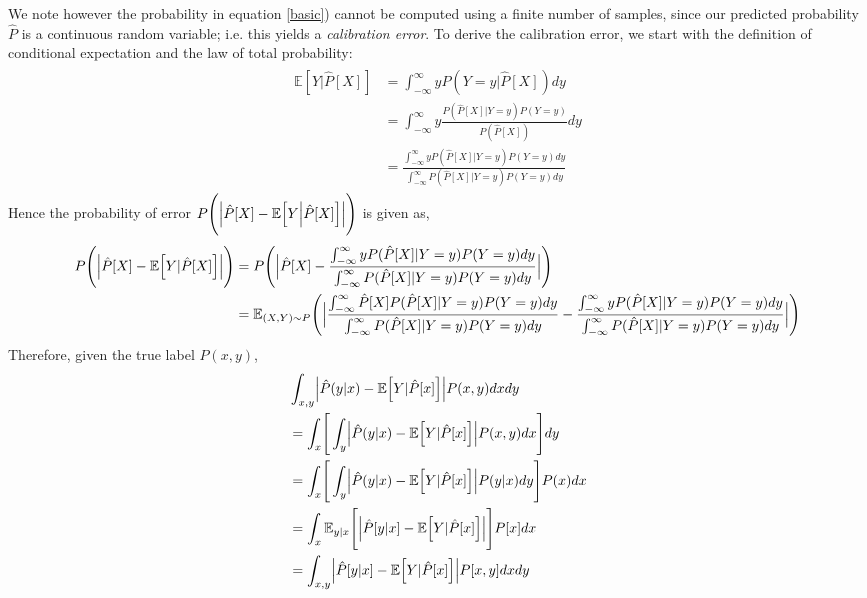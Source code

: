 \documentclass[10pt]{article}[draft]
\begin{document}
We note however the probability in equation \ref{basic}) cannot be computed using a finite number of samples, since our predicted probability $\hat{P}$ is a continuous random variable; i.e. this  yields a \emph{calibration error}.  To derive the calibration error, we start with the definition of conditional expectation and the  law of total probability:
\begin{align*}
	\begin{split}
	\mathbb{E}[Y|\hat{P}[X]] &= \int_{-\infty}^{\infty} y P(Y=y|\hat{P}[X])dy \\
	&= \int_{-\infty}^{\infty}  y \frac{P(\hat{P}[X]|Y=y)P(Y=y)}{P(\hat{P}[X])}dy \\
	&= \frac{\int_{-\infty}^{\infty}  y P(\hat{P}[X]|Y=y)P(Y=y)dy}{\int_{-\infty}^{\infty}  P(\hat{P}[X]|Y=y)P(Y=y)dy}
	\end{split}
\end{align*}
Hence the probability of error $P  \Biggl( \Bigl| \hat{P}[X] - \mathbb{E}\Bigr[ Y \Bigr| \hat{P}[X]\Bigl] \Bigr| \Biggr)$ is given as,
\begin{align*}
	\begin{split}
P  \Biggl( \Bigl| \hat{P}[X] - \mathbb{E}\Bigr[ Y | \hat{P}[X]\Bigl] \Bigr| \Biggr) &=  P  \Biggl( \Bigl| \hat{P}[X] - \frac{\int_{-\infty}^{\infty}  y P(\hat{P}[X]|Y=y)P(Y=y)dy}{\int_{-\infty}^{\infty}  P(\hat{P}[X]|Y=y)P(Y=y)dy} \Bigr| \Biggr) \\
	&= \mathbb{E}_{(X,Y)\sim P } \Biggl( \Bigl| \frac{\int_{-\infty}^{\infty}  \hat{P}[X] P(\hat{P}[X]|Y=y)P(Y=y)dy}{\int_{-\infty}^{\infty}  P(\hat{P}[X]|Y=y)P(Y=y)dy} - \frac{\int_{-\infty}^{\infty}  y P(\hat{P}[X]|Y=y)P(Y=y)dy}{\int_{-\infty}^{\infty}  P(\hat{P}[X]|Y=y)P(Y=y)dy} \Bigr| \Biggr)
	\end{split}
\end{align*}
Therefore, given the true label  $P(x,y)$,
\begin{equation}
	\begin{split}
& \int_{x,y}  \Bigr|  \hat{P} (y|x) - \mathbb{E}  \Bigl[ Y | \hat{P}[x] \Bigr] \Bigl| P(x,y) dx dy \\
& =  \int_{x} \Biggr[  \int_{y}  \Bigr|  \hat{P} (y|x) - \mathbb{E}  \Bigl[ Y | \hat{P}[x] \Bigr] \Bigl| P(x,y) dx \Biggr] dy \\
&=  \int_{x} \Biggr[  \int_{y}  \Bigr|  \hat{P} (y|x) - \mathbb{E}  \Bigl[ Y | \hat{P}[x] \Bigr] \Bigl| P(y | x	) dy \Biggr] P(x)dx \\
&=  \int_{x} \mathbb{E}_{y|x}\Biggr[ \Bigr|  \hat{P}[y|x] - \mathbb{E}\Bigr[ Y | \hat{P}[x]\Bigl] \Bigl| \Biggl] P[x] dx \\
&=  \int_{x,y}  \Bigr|  \hat{P}[y|x] - \mathbb{E}\Bigr[ Y | \hat{P}[x]\Bigl] \Bigl| P[x,y] dx dy 
\end{split}
\end{equation}
\end{document}
